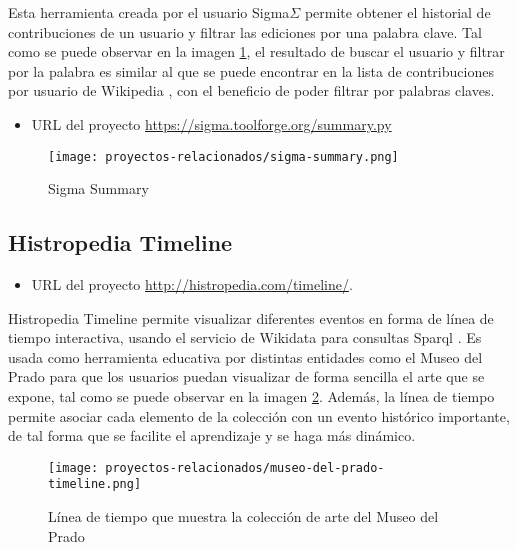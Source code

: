 Esta herramienta creada por el usuario Sigma\(\Sigma\) permite obtener el historial de contribuciones de un usuario y filtrar las ediciones por una palabra clave. Tal como se puede observar en la imagen \ref{fig:sigma_summary}, el resultado de buscar el usuario  y filtrar por la palabra  es similar al que se puede encontrar en la lista de contribuciones por usuario de Wikipedia \cite{UserClarityfiend}, con el beneficio de poder filtrar por palabras claves.

\begin{itemize}
    \item URL del proyecto \url{https://sigma.toolforge.org/summary.py}
\end{itemize}

\begin{figure}[H]
    \centering
    \texttt{[image: proyectos-relacionados/sigma-summary.png]}
    \caption{Sigma Summary}
    \label{fig:sigma_summary}
\end{figure}

\subsection{Histropedia Timeline}

\begin{itemize}
    \item URL del proyecto \url{http://histropedia.com/timeline/}.
\end{itemize}

Histropedia Timeline permite visualizar diferentes eventos en forma de línea de tiempo interactiva, usando el servicio de Wikidata para consultas Sparql \cite{WikidataSparql}. Es usada como herramienta educativa por distintas entidades como el Museo del Prado para que los usuarios puedan visualizar de forma sencilla el arte que se expone, tal como se puede observar en la imagen \ref{fig:museo-de-prado-timeline}. Además, la línea de tiempo permite asociar cada elemento de la colección con un evento histórico importante, de tal forma que se facilite el aprendizaje y se haga más dinámico.

\begin{figure}[H]
    \centering
    \texttt{[image: proyectos-relacionados/museo-del-prado-timeline.png]}
    \caption{Línea de tiempo que muestra la colección de arte del Museo del Prado}
    \label{fig:museo-de-prado-timeline}
\end{figure}



